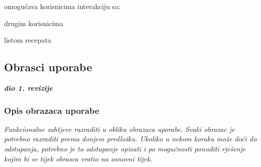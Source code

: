 \begin{packed_enum}
				\item{}
				\begin{packed_enum}
					\item omogućava korisnicima interakciju sa:
					\begin{packed_enum}
						\item drugim korisnicima
						\item listom recepata
					\end{packed_enum}
				\end{packed_enum}
			
			\end{packed_enum}
			
			\eject 
			
			
				
			\subsection{Obrasci uporabe}
				
				\textbf{\textit{dio 1. revizije}}
				
				\subsubsection{Opis obrazaca uporabe}
					\textit{Funkcionalne zahtjeve razraditi u obliku obrazaca uporabe. Svaki obrazac je potrebno razraditi prema donjem predlošku. Ukoliko u nekom koraku može doći do odstupanja, potrebno je to odstupanje opisati i po mogućnosti ponuditi rješenje kojim bi se tijek obrasca vratio na osnovni tijek.}\\




